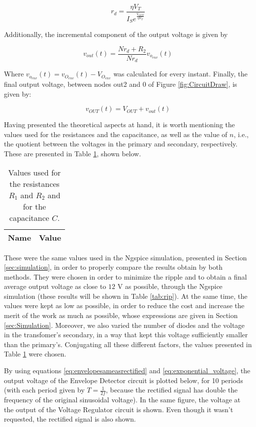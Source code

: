 \begin{equation} \label{eq:incremental_resistance}
  r_d=\frac{\eta V_T}{I_Se^{\frac{V_{OUT}}{\eta V_T}}}
\end{equation}

Additionally, the incremental component of the output voltage is given by

\begin{equation} \label{eq:incremental_voltage}
  v_{out}(t)=\frac{Nr_d+R_2}{Nr_d}v_{o_{env}}(t)
\end{equation}

Where $v_{o_{env}}(t)=v_{O_{env}}(t)-V_{O_{env}}$ was calculated for every instant. Finally, the final output voltage, between nodes out2 and 0 of Figure \ref{fig:CircuitDraw}, is given by:

\begin{equation} \label{eq:final_output_voltage}
  v_{OUT}(t)=V_{OUT}+v_{out}(t)
\end{equation}

Having presented the theoretical aspects at hand, it is worth mentioning the values used for the resistances and the capacitance, as well as the value of $n$, i.e., the quotient between the voltages in the primary and secondary, respectively. These are presented in Table \ref{tab:ChosenValues}, shown below.

\begin{table}[H]
  \centering
  \begin{tabular}{|c|c|}
    \hline    
    {\bf Name} & {\bf Value} \\ \hline
    
  \end{tabular}
  \caption{Values used for the resistances $R_1$ and $R_2$ and for the capacitance $C$.}
  \label{tab:ChosenValues}
\end{table}

 These were the same values used in the Ngspice simulation, presented in Section \ref{sec:simulation}, in order to properly compare the results obtain by both methods. They were chosen in order to minimize the ripple and to obtain a final average output voltage as close to $12$ V as possible, through the Ngspice simulation (these results will be shown in Table \ref{tab:rip}). At the same time, the values were kept as low as possible, in order to reduce the cost and increase the merit of the work as much as possible, whose expressions are given in Section \ref{sec:Simulation}. Moreover, we also varied the number of diodes and the voltage in the transfomer's secondary, in a way that kept this voltage sufficiently smaller than the primary's. Conjugating all these different factors, the values presented in Table \ref{tab:ChosenValues} were chosen.
\par
By using equations \ref{eq:envelopesameasrectified} and \ref{eq:exponential_voltage}, the output voltage of the Envelope Detector circuit is plotted below, for 10 periods (with each period given by $T=\frac{1}{2f}$, because the rectified signal has double the frequency of the original sinusoidal voltage). In the same figure, the voltage at the output of the Voltage Regulator circuit is shown. Even though it wasn't requested, the rectified signal is also shown.


